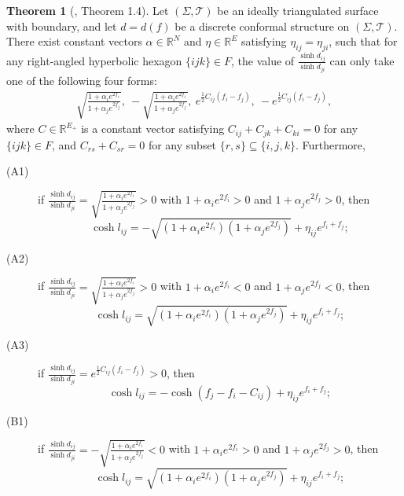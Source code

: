 \documentclass[12pt]{amsart}
\theoremstyle{definition}
\newtheorem{theorem}{Theorem}[section]
\begin{document}
\begin{theorem}[\cite{X-Z DCS1}, Theorem 1.4]\label{Thm: DCS}
Let $(\Sigma,\mathcal{T})$ be an ideally triangulated surface with boundary, and let $d=d(f)$ be a discrete conformal structure on $(\Sigma,\mathcal{T})$.
There exist constant vectors $\alpha\in \mathbb{R}^N$ and $\eta\in \mathbb{R}^{E}$ satisfying $\eta_{ij}=\eta_{ji}$, such that for any right-angled hyperbolic hexagon $\{ijk\}\in F$,
the value of $\frac{\sinh d_{ij}}{\sinh d_{ji}}$ can only take one of the following four forms:
\begin{gather*}
\sqrt{\frac{1+\alpha_ie^{2f_i}}{1+\alpha_je^{2f_j}}},\
-\sqrt{\frac{1+\alpha_ie^{2f_i}}{1+\alpha_je^{2f_j}}},\
e^{\frac{1}{2}C_{ij}(f_i-f_j)},\
-e^{\frac{1}{2}C_{ij}(f_i-f_j)},
\end{gather*}
where $C\in \mathbb{R}^{E_+}$ is a constant vector satisfying
$C_{ij}+C_{jk}+C_{ki}=0$ for any $\{ijk\}\in F$, and $C_{rs}+C_{sr}=0$ for any subset $\{r,s\}\subseteq\{i,j,k\}$.
Furthermore,
\begin{description}
\item[(A1)]
if $\frac{\sinh d_{ij}}{\sinh d_{ji}}=\sqrt{\frac{1+\alpha_ie^{2f_i}}{1+\alpha_je^{2f_j}}}>0$ with $1+\alpha_ie^{2f_i}>0$ and $1+\alpha_je^{2f_j}>0$,
then
\begin{equation}\label{Eq: DCS3}
\cosh l_{ij}
=-\sqrt{(1+\alpha_ie^{2f_i})(1+\alpha_je^{2f_j})}
+\eta_{ij}e^{f_i+f_j};
\end{equation}

\item[(A2)]
if $\frac{\sinh d_{ij}}{\sinh d_{ji}}
=\sqrt{\frac{1+\alpha_ie^{2f_i}}{1+\alpha_je^{2f_j}}}>0$ with $1+\alpha_ie^{2f_i}<0$ and $1+\alpha_je^{2f_j}<0$,
then
\begin{equation}\label{Eq: new 1}
\cosh l_{ij}
=\sqrt{(1+\alpha_ie^{2f_i})(1+\alpha_je^{2f_j})}
+\eta_{ij}e^{f_i+f_j};
\end{equation}

\item[(A3)]
if $\frac{\sinh d_{ij}}{\sinh d_{ji}}
=e^{\frac{1}{2}C_{ij}(f_i-f_j)}>0$,
then
\begin{equation}\label{Eq: DCS1}
\cosh l_{ij}
=-\cosh(f_j-f_i-C_{ij})+\eta_{ij}e^{f_i+f_j};
\end{equation}

\item[(B1)] if $\frac{\sinh d_{ij}}{\sinh d_{ji}}
=-\sqrt{\frac{1+\alpha_ie^{2f_i}}{1+\alpha_je^{2f_j}}}<0$
with $1+\alpha_ie^{2f_i}>0$ and $1+\alpha_je^{2f_j}>0$,
then
\begin{equation}\label{Eq: DCS4}
\cosh l_{ij}
=\sqrt{(1+\alpha_ie^{2f_i})(1+\alpha_je^{2f_j})}
+\eta_{ij}e^{f_i+f_j};
\end{equation}


\end{description}
\end{theorem}
\end{document}
